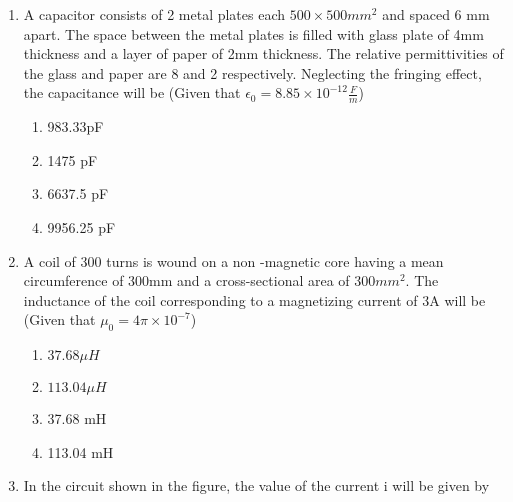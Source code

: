 \documentclass[journal,12pt,onecolumn]{IEEEtran}
\theoremstyle{remark}
\begin{document}
\begin{enumerate}
       \item A capacitor consists of 2 metal plates each $500 \times 500 mm^2$ and spaced 6 mm apart. The space between the metal plates is filled with glass plate of 4mm thickness and a layer of paper of 2mm thickness. The relative permittivities of the glass and paper are 8 and 2 respectively. Neglecting the fringing effect, the capacitance will be (Given that $\epsilon_{0}=8.85\times 10^{-12}\frac{F}{m}$)
       \begin{enumerate}
           \item 983.33pF
           \item 1475 pF
           \item 6637.5 pF
           \item 9956.25 pF
       \end{enumerate}
      \item A coil of 300 turns is wound on a non -magnetic core having a mean circumference of 300mm and a cross-sectional area of $300 mm^2$. The inductance of the coil corresponding to a magnetizing current of 3A will be (Given that $\mu_0=4\pi\times10^{-7}$)
      \begin{enumerate}
      \item $37.68\mu H$
      \item $113.04\mu H$
      \item 37.68 mH
      \item 113.04 mH
      \end{enumerate}
      \item In the circuit shown in the figure, the value of the current i will be given by
	      \begin{figure}[!ht]
\centering
{}
\end{figure}
\end{enumerate}
\end{document}
